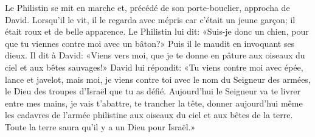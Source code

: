 Le Philistin se mit en marche et, précédé de son porte-bouclier, approcha de David.
Lorsqu’il le vit, il le regarda avec mépris car c’était un jeune garçon;
	il était roux et de belle apparence.
Le Philistin lui dit: «Suis-je donc un chien,
	pour que tu viennes contre moi avec un bâton?»
	Puis il le maudit en invoquant ses dieux.
Il dit à David: «Viens vers moi,
	que je te donne en pâture aux oiseaux du ciel et aux bêtes sauvages!»
David lui répondit: «Tu viens contre moi avec épée, lance et javelot,
	mais moi, je viens contre toi avec le nom du Seigneur des armées,
	le Dieu des troupes d’Israël que tu as défié.
Aujourd’hui le Seigneur va te livrer entre mes mains,
	je vais t’abattre, te trancher la tête,
	donner aujourd’hui même les cadavres de l’armée philistine
		aux oiseaux du ciel et aux bêtes de la terre.
Toute la terre saura qu’il y a un Dieu pour Israël.»
